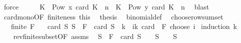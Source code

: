 \begin{isabellebody}
\ force\isanewline
\ \ \isamarkupfalse%
\ \isamarkupfalse%
\ {\isachardoublequoteopen}{\isacharbraceleft}{\kern0pt}K\ {\isasymin}\ Pow\ {\isacharbraceleft}{\kern0pt}{}{\isachardot}{\kern0pt}{\isachardot}{\kern0pt}{\isacharless}{\kern0pt}x{\isacharbraceright}{\kern0pt}{\isachardot}{\kern0pt}\ card\ K\ {\isacharequal}{\kern0pt}\ n{\isacharbraceright}{\kern0pt}\ {\isasymsubseteq}\ {\isacharbraceleft}{\kern0pt}K\ {\isasymin}\ Pow\ {\isacharbraceleft}{\kern0pt}{}{\isachardot}{\kern0pt}{\isachardot}{\kern0pt}{\isacharless}{\kern0pt}y{\isacharbraceright}{\kern0pt}{\isachardot}{\kern0pt}\ card\ K\ {\isacharequal}{\kern0pt}\ n{\isacharbraceright}{\kern0pt}{\isachardoublequoteclose}\ \isamarkupfalse%
\ blast\isanewline
\ \ \isamarkupfalse%
\ card{\isacharunderscore}{\kern0pt}mono{\isacharbrackleft}{\kern0pt}OF\ finiteness\ this{\isacharbrackright}{\kern0pt}\ \isamarkupfalse%
\ {\isacharquery}{\kern0pt}thesis\ \isamarkupfalse%
\ binomial{\isacharunderscore}{\kern0pt}def\ \isacommand{{\isachardot}{\kern0pt}}\isamarkupfalse%
\isanewline
{}\isamarkupfalse%
%
\endisatagproof
{\isafoldproof}%
%
\isadelimproof
\isanewline
%
\endisadelimproof
\isanewline
{}\isamarkupfalse%
\ choose{\isacharunderscore}{\kern0pt}row{\isacharunderscore}{\kern0pt}sum{\isacharunderscore}{\kern0pt}set{\isacharcolon}{\kern0pt}\isanewline
\ \ \ {\isachardoublequoteopen}finite\ {\isacharparenleft}{\kern0pt}{\isasymUnion}F{\isacharparenright}{\kern0pt}{\isachardoublequoteclose}\isanewline
\ \ \ {\isachardoublequoteopen}card\ {\isacharbraceleft}{\kern0pt}S{\isachardot}{\kern0pt}\ S\ {\isasymsubseteq}\ {\isasymUnion}F\ {\isasymand}\ card\ S\ {\isasymle}\ k{\isacharbraceright}{\kern0pt}\ {\isacharequal}{\kern0pt}\ {\isacharparenleft}{\kern0pt}{\isasymSum}i{\isasymle}k{\isachardot}{\kern0pt}\ card\ {\isacharparenleft}{\kern0pt}{\isasymUnion}\ F{\isacharparenright}{\kern0pt}\ choose\ i{\isacharparenright}{\kern0pt}{\isachardoublequoteclose}\isanewline
%
\isadelimproof
%
\endisadelimproof
%
\isatagproof
{}\isamarkupfalse%
\ {\isacharparenleft}{\kern0pt}induction\ k{\isacharparenright}{\kern0pt}\isanewline
\ \ \isamarkupfalse%
\ {}\isanewline
\ \ \isamarkupfalse%
\ rev{\isacharunderscore}{\kern0pt}finite{\isacharunderscore}{\kern0pt}subset{\isacharbrackleft}{\kern0pt}OF\ assms{\isacharbrackright}{\kern0pt}\ \isamarkupfalse%
\ {\isachardoublequoteopen}S\ {\isasymsubseteq}\ {\isasymUnion}F\ {\isasymand}\ card\ S\ {\isasymle}\ {}\ {\isasymlongleftrightarrow}\ S\ {\isacharequal}{\kern0pt}\ {\isacharbraceleft}{\kern0pt}{\isacharbraceright}{\kern0pt}{\isachardoublequoteclose}\ \ S\ \isamarkupfalse%

\end{isabellebody}

